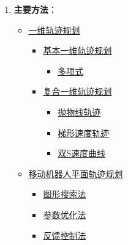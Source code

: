 \documentclass[../main.tex]{subfiles}
\begin{document}
\begin{enumerate}
\begin{itemize}
\begin{enumerate}
\begin{enumerate}
                            \item 中间状态（部分问题）
                        \end{enumerate}                    
                    \item 连续性/光滑性要求\footnote{路径得到的是直线段，如果完全按照直线段执行，对于存在非完整运动学约束的机器人来讲，无法实现流畅运动，\textbf{移动效率低}；通过\textbf{轨迹平滑}可以减少因为方向变化而花费的启停时间、以及因方向突变而导致的底盘打滑问题}\footnote{速度连续属于\textbf{一阶平滑}，加速度连续也就是速度平滑属于\textbf{二阶平滑}}
                    \item 无碰约束
                \end{enumerate}
            \item \textbf{求参}：根据约束或/和最优目标，求取控制律\textbf{函数参数}
        \end{itemize}
    \item \textbf{主要方法}：
        \begin{itemize}
            \item \hyperref[sec:1d-poly]{一维轨迹规划}
                \begin{itemize}
                    \item \hyperref[sec:basic-1d]{基本一维轨迹规划}
                        \begin{itemize}
                            \item \hyperref[method:poly]{多项式}
                        \end{itemize}
                    \item \hyperref[sec:composite-1d]{复合一维轨迹规划}
                    \begin{itemize}
                        \item \hyperref[method:parabola]{抛物线轨迹}
                        \item \hyperref[method:trapezoid]{梯形速度轨迹}
                        \item \hyperref[method:doubleS]{双S速度曲线}
                    \end{itemize}
                \end{itemize}
            \item \hyperref[sec:planar]{移动机器人平面轨迹规划}
                \begin{itemize}
                    \item \hyperref[method:graph]{图形搜索法}
                    \item \hyperref[method:opt]{参数优化法}
                    \item \hyperref[method:feedback]{反馈控制法}
                \end{itemize}
        \end{itemize}
\end{enumerate}
\end{document}

